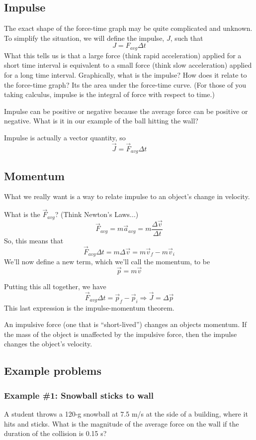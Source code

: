 \subsection{Impulse}
The exact shape of the force-time graph may be quite complicated and unknown. To simplify the situation, we will define the impulse, $J$, such that 
$$\boxed{J=F_{avg}\Delta{t}}$$
What this tells us is that a large force (think rapid acceleration) applied for a short time interval is equivalent to a small force (think slow acceleration) applied for a long time interval. Graphically, what is the impulse? How does it relate to the force-time graph? Its the area under the force-time curve. (For those of you taking calculus, impulse is the integral of force with respect to time.)

Impulse can be positive or negative because the average force can be positive or negative. What is it in our example of the ball hitting the wall?

Impulse is actually a vector quantity, so 
$$\boxed{\vec{J}=\vec{F}_{avg}\Delta{t}}$$

\subsection{Momentum}
What we really want is a way to relate impulse to an object's change in velocity.

What is the $\vec{F}_{avg}$? (Think Newton's Laws...)
$$\vec{F}_{avg}=m\vec{a}_{avg}=m\frac{\Delta{\vec{v}}}{\Delta{t}}$$
So, this means that
$$\vec{F}_{avg}\Delta{t}=m\Delta{\vec{v}}=m\vec{v}_f-m\vec{v}_i$$
We'll now define a new term, which we'll call the momentum, to be 
$$\boxed{\vec{p}=m\vec{v}}$$

Putting this all together, we have
$$\vec{F}_{avg}\Delta{t}=\vec{p}_f-\vec{p}_i\Rightarrow \boxed{\vec{J}=\Delta{\vec{p}}}$$
This last expression is the impulse-momentum theorem.

An impulsive force (one that is ``short-lived'') changes an objects momentum. If the mass of the object is unaffected by the impulsive force, then the impulse changes the object's velocity.

\subsection{Example problems}
\subsubsection*{Example \#1: Snowball sticks to wall}
A student throws a 120-g snowball at 7.5 m/s at the side of a building, where it hits and sticks. What is the magnitude of the average force on the wall if the duration of the collision is 0.15 s?

